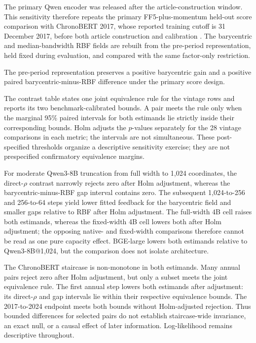 The primary Qwen encoder was released after the article-construction window.
This sensitivity therefore repeats the primary FF5-plus-momentum held-out
score comparison with ChronoBERT 2017, whose reported training cutoff is
31 December 2017, before both article construction and calibration
\citep{he_chronobert_2025}.
The barycentric and median-bandwidth RBF fields are rebuilt from the pre-period
representation, held fixed during evaluation, and compared with the same
factor-only restriction.



The pre-period representation preserves a positive barycentric gain
and a positive
paired barycentric-minus-RBF difference under the primary score design.

The contrast table states one joint equivalence rule for the vintage rows and
reports its two benchmark-calibrated bounds.
A pair meets the rule only when the marginal 95\% paired intervals for both
estimands lie strictly inside their corresponding bounds.
Holm adjusts the $p$-values separately for the 28 vintage comparisons in each
metric; the intervals are not simultaneous.
These post-specified thresholds organize a descriptive sensitivity exercise;
they are not prespecified confirmatory equivalence margins.



For moderate Qwen3-8B truncation from full width to 1,024 coordinates, the
direct-$\rho$ contrast narrowly rejects zero after Holm adjustment, whereas the
barycentric-minus-RBF gap interval contains zero.
The subsequent 1,024-to-256 and 256-to-64 steps yield lower fitted feedback for
the barycentric field and smaller gaps relative to RBF after Holm adjustment.
The full-width 4B cell raises both estimands, whereas the fixed-width 4B
cell lowers both after Holm adjustment; the opposing native- and fixed-width
comparisons therefore cannot be read as one pure capacity effect.
BGE-large lowers both estimands relative to Qwen3-8B@1,024, but the comparison
does not isolate architecture.

The ChronoBERT staircase is non-monotone in both estimands.
Many annual pairs reject zero after Holm adjustment, but only a subset meets
the joint equivalence rule.
The first annual step lowers both estimands after adjustment: its direct-$\rho$
and gap intervals lie within their respective equivalence bounds.
The 2017-to-2024 endpoint meets both bounds without Holm-adjusted rejection.
Thus bounded differences for selected pairs do not establish staircase-wide
invariance, an exact null, or a causal effect of later information.
Log-likelihood remains descriptive throughout.

